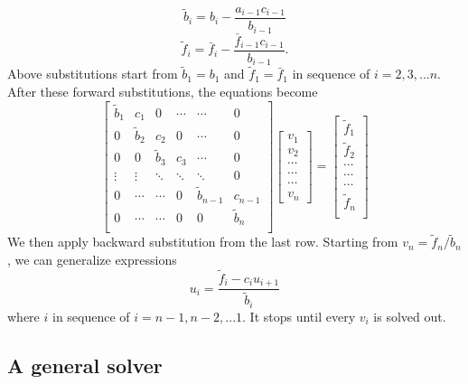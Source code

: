 \documentclass[12pt]{article}
\begin{document}
\begin{equation}
\tilde{b}_i = b_i - \frac{a_{i-1}c_{i-1}}{b_{i-1}}
\end{equation}
\begin{equation}
\tilde{f}_i = \bar{f}_i - \frac{\bar{f}_{i-1}c_{i-1}}{b_{i-1}}.
\end{equation}
Above substitutions start from $\tilde{b}_1 = b_1$ and $\tilde{f}_1 = \bar{f}_1$ in sequence of $i = 2, 3, ... n$. After these forward substitutions, the equations become
\[   
\left[\begin{array}{cccccc}   
    \tilde{b}_1 &    c_1    & 0   & \cdots  & \cdots  & 0\\  
    0 &    \tilde{b}_2    & c_2  & 0       & \cdots  & 0\\
    0 &    0   & \tilde{b}_3  & c_3       & \cdots  & 0\\ 
    \vdots &    \vdots    & \ddots  & \ddots  & \ddots  & 0\\ 
    0 &    \cdots    & \cdots  &0       & \tilde{b}_{n-1}  & c_{n-1}\\ 
    0 &    \cdots    & \cdots  & 0       & 0  & \tilde{b}_{n}\\ 
\end{array}\right]\left[\begin{array}{c}
     v_1\\    v_2\\ \cdots \\ \cdots\\ \cdots\\ v_{n}
 \end{array}\right] = \left[\begin{array}{c}
 \tilde{f}_1 \\    \tilde{f}_2   \\ \cdots\\ \cdots \\ \cdots \\ \tilde{f}_n\\
 \end{array}\right]
\] 
We then apply backward substitution from the last row. Starting from $v_n = \tilde{f}_n/\tilde{b}_n$, we can generalize expressions
\begin{equation}
u_i = \frac{\tilde{f}_i - c_{i}u_{i+1}}{\tilde{b}_i}
\end{equation}
where $i$ in sequence of $i = n-1, n-2, ... 1$. It stops until every $v_i$ is solved out. 

\subsection{A general solver}
\end{document}
